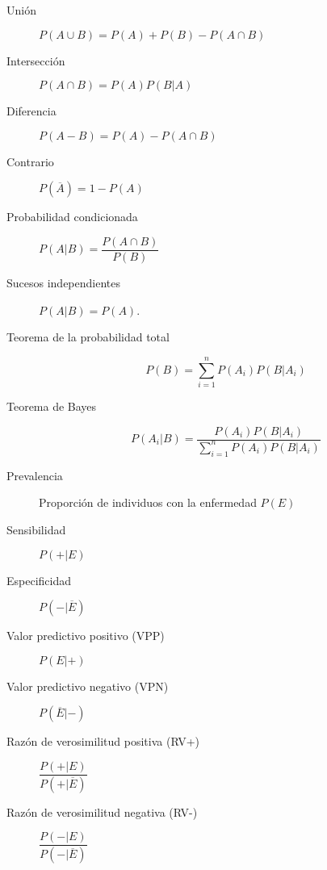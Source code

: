 \begin{multicols*}{2}
	\begin{tcolorbox}[hbox, title=Probabilidad básica]
		\begin{minipage}{0.4\textwidth}
			\begin{description}
				\item [Unión] $P(A\cup B)=P(A)+P(B)-P(A\cap B)$
				\item [Intersección] $P(A\cap B)=P(A)P(B|A)$
				\item [Diferencia] $P(A-B)=P(A)-P(A\cap B)$
				\item [Contrario] $P(\overline{A})=1-P(A)$
			\end{description}
		\end{minipage}
	\end{tcolorbox}

	\begin{tcolorbox}[hbox, title=Probabilidad condicionada]
		\begin{minipage}{0.4\textwidth}
			\begin{description}
				\item [Probabilidad condicionada] $P(A|B)=\dfrac{P(A\cap B)}{P(B)}$
				\item [Sucesos independientes] $P(A|B)=P(A)$.
				\item [Teorema de la probabilidad total] \[P(B)=\sum_{i=1}^n P(A_i)P(B|A_i)\]
				\item [Teorema de Bayes] \[P(A_i|B)=\dfrac{P(A_i)P(B|A_i)}{\sum_{i=1}^n P(A_i)P(B|A_i)}\]
			\end{description}
		\end{minipage}
	\end{tcolorbox}

	\begin{tcolorbox}[hbox, title=Test diagnósticos]
		\begin{minipage}{0.4\textwidth}
			\begin{description}
				\item[Prevalencia] Proporción de individuos con la enfermedad $P(E)$
				\item[Sensibilidad] $P(+|E)$
				\item[Especificidad] $P(-|\overline{E})$
				\item[Valor predictivo positivo (VPP)] $P(E|+)$
				\item[Valor predictivo negativo (VPN)] $P(\overline{E}|-)$
				\item[Razón de verosimilitud positiva (RV+)] $\dfrac{P(+|E)}{P(+|\overline{E})}$
				\item[Razón de verosimilitud negativa (RV-)] $\dfrac{P(-|E)}{P(-|\overline{E})}$
			\end{description}
		\end{minipage}
	\end{tcolorbox}



\end{multicols*}
